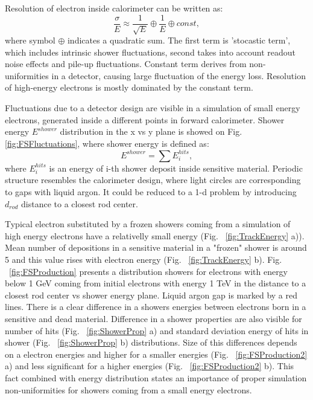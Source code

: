 Resolution of electron inside calorimeter can be written as:
\begin{equation}\label{eq:EMResoultion}
\frac{\sigma}{E} \approx \frac{1}{\sqrt{E}}	\oplus \frac{1}{E} 	\oplus const,
\end{equation}
where symbol $\oplus$ indicates a quadratic sum. The first term is 'stocastic term', which includes intrinsic shower fluctuations, second takes into account readout noise effects and pile-up fluctuations. Constant term derives from non-uniformities in a detector, causing large fluctuation of the energy loss. Resolution of high-energy electrons is mostly dominated by the constant term. 

Fluctuations due to a detector design are visible in a simulation of small energy electrons, generated inside a different points in forward calorimeter. Shower energy $E^{shower}$ distribution in the x vs y plane is showed on Fig. \ref{fig:FSFluctuations}, where shower energy is defined as:
\begin{equation}
E^{shower}=\sum E_i^{hits},
\end{equation}
where $E_i^{hits}$ is an energy of i-th shower deposit inside sensitive material. Periodic structure resembles the calorimeter design, where light circles are corresponding to gaps with liquid argon. It could be reduced to a 1-d problem by introducing $d_{rod}$ distance to a closest rod center. 

Typical electron substituted by a frozen showers coming from a simulation of high energy electrons have a relativelly small energy (Fig. ~\ref{fig:TrackEnergy} a)). Mean number of depositions in a sensitive material in a "frozen" shower is around 5 and this value rises with electron energy (Fig. ~\ref{fig:TrackEnergy} b).  Fig. ~\ref{fig:FSProduction} presents a distribution showers for electrons with energy below 1 GeV coming from initial electrons with energy 1 TeV in the distance to a closest rod center vs shower energy plane. Liquid argon gap is marked by a red lines. There is a clear difference in a showers energies between electrons born in a sensitive and dead material. Difference in a shower properties are also visible for number of hits  (Fig. ~\ref{fig:ShowerProp} a) and standard deviation energy of hits in shower (Fig. ~\ref{fig:ShowerProp} b) distributions. Size of this differences depends on a electron energies and higher for a smaller energies (Fig. ~\ref{fig:FSProduction2} a) and less significant for a higher energies (Fig. ~\ref{fig:FSProduction2} b).  This fact combined with energy distribution states an importance of proper simulation non-uniformities for showers coming from a small energy electrons.

